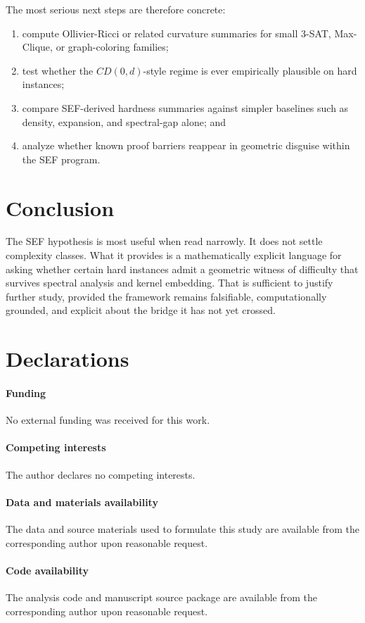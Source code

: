 \documentclass{svjour3}
\begin{document}
The most serious next steps are therefore concrete:
\begin{enumerate}[leftmargin=*]
\item compute Ollivier-Ricci or related curvature summaries for small 3-SAT, Max-Clique, or graph-coloring families;
\item test whether the $CD(0,d)$-style regime is ever empirically plausible on hard instances;
\item compare SEF-derived hardness summaries against simpler baselines such as density, expansion, and spectral-gap alone; and
\item analyze whether known proof barriers reappear in geometric disguise within the SEF program.
\end{enumerate}

\section{Conclusion}
The SEF hypothesis is most useful when read narrowly. It does not settle complexity classes. What it provides is a mathematically explicit language for asking whether certain hard instances admit a geometric witness of difficulty that survives spectral analysis and kernel embedding. That is sufficient to justify further study, provided the framework remains falsifiable, computationally grounded, and explicit about the bridge it has not yet crossed.

\section*{Declarations}
\paragraph{Funding} No external funding was received for this work.
\paragraph{Competing interests} The author declares no competing interests.
\paragraph{Data and materials availability} The data and source materials used to formulate this study are available from the corresponding author upon reasonable request.
\paragraph{Code availability} The analysis code and manuscript source package are available from the corresponding author upon reasonable request.
\end{document}
